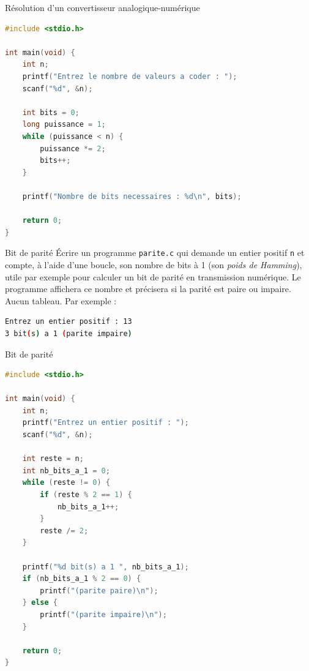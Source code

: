 \begin{UPSTIcorrectionP}{Résolution d'un convertisseur analogique-numérique}
	\begin{lstlisting}[language=c]
#include <stdio.h>

int main(void) {
    int n;
    printf("Entrez le nombre de valeurs a coder : ");
    scanf("%d", &n);

    int bits = 0;
    long puissance = 1;
    while (puissance < n) {
        puissance *= 2;
        bits++;
    }

    printf("Nombre de bits necessaires : %d\n", bits);

    return 0;
}
	\end{lstlisting}
\end{UPSTIcorrectionP}

\begin{UPSTIexercice}{Bit de parité}
	\UPSTIetape Écrire un programme \texttt{parite.c} qui demande un entier positif \texttt{n} et compte, à l'aide d'une boucle, son nombre de bits à 1 (son \emph{poids de Hamming}), utile par exemple pour calculer un bit de parité en transmission numérique. Le programme affichera ce nombre et précisera si la parité est paire ou impaire. Aucun tableau.
	Par exemple :
	\begin{lstlisting}[language=bash,style=console]
Entrez un entier positif : 13
3 bit(s) a 1 (parite impaire)
\end{lstlisting}
\end{UPSTIexercice}

\begin{UPSTIcorrectionP}{Bit de parité}
	\begin{lstlisting}[language=c]
#include <stdio.h>

int main(void) {
    int n;
    printf("Entrez un entier positif : ");
    scanf("%d", &n);

    int reste = n;
    int nb_bits_a_1 = 0;
    while (reste != 0) {
        if (reste % 2 == 1) {
            nb_bits_a_1++;
        }
        reste /= 2;
    }

    printf("%d bit(s) a 1 ", nb_bits_a_1);
    if (nb_bits_a_1 % 2 == 0) {
        printf("(parite paire)\n");
    } else {
        printf("(parite impaire)\n");
    }

    return 0;
}
	\end{lstlisting}
\end{UPSTIcorrectionP}
